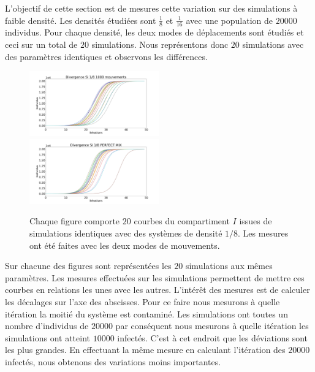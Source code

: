 L'objectif de cette section est de mesures cette variation sur des simulations à faible densité. Les densités étudiées sont $\frac{1}{8}$ et $\frac{1}{16}$ avec une population de $20000$ individus. Pour chaque densité, les deux modes de déplacements sont étudiés et ceci sur un total de $20$ simulations. Nous représentons donc $20$ simulations avec des paramètres identiques et observons les différences.

\newpage

\begin{figure}
	\centering
	\captionsetup{justification=centering}
	\includegraphics[width=0.5\textwidth]{Images/SI_divergence_8_1000.pdf}
	\includegraphics[width=0.5\textwidth]{Images/SI_divergence_8_mix.pdf}
	\caption[Variations aléatoires : SI]{Chaque figure comporte $20$ courbes du compartiment $I$ issues de simulations identiques avec des systèmes de densité $1/8$. Les mesures ont été faites avec les deux modes de mouvements.}
\end{figure}

Sur chacune des figures sont représentées les $20$ simulations aux mêmes paramètres. Les mesures effectuées sur les simulations permettent de mettre ces courbes en relations les unes avec les autres. L'intérêt des mesures est de calculer les décalages sur l'axe des abscisses. Pour ce faire nous mesurons à quelle itération la moitié du système est contaminé. Les simulations ont toutes un nombre d'individus de $20000$ par conséquent nous mesurons à quelle itération les simulations ont atteint $10000$ infectés. C'est à cet endroit que les déviations sont les plus grandes. En effectuant la même mesure en calculant l'itération des $20000$ infectés, nous obtenons des variations moins importantes.\\

